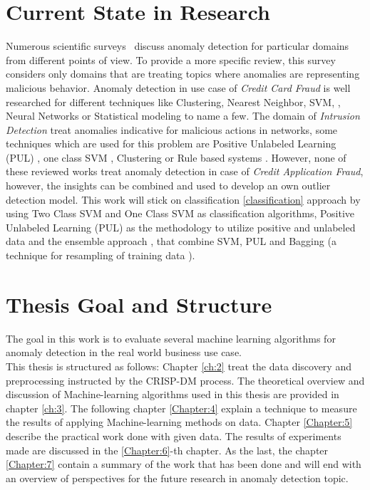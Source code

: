 \section{Current State in Research}\label{state-of-the-art}
Numerous scientific surveys~\cite{Agyemang:2006:CSN:1609942.1609946,Chandola:2009:ADS:1541880.1541882,Chandola:2012:ADD:2197072.2197116,Pimentel:2014:RRN:2588908.2589196} discuss anomaly detection for particular domains from different points of view. To provide a more specific review, this survey considers only domains that are treating topics where anomalies are representing malicious behavior. Anomaly detection in use case of \textit{Credit Card Fraud} is well researched for different techniques like Clustering, Nearest Neighbor, SVM, \cite{Eskin:2010}, Neural Networks \cite{Ghosh;Reilly;1994} or Statistical modeling \cite{Agarwal:2005} to name a few. The domain of \textit{Intrusion Detection} treat anomalies indicative for malicious actions in networks, some techniques which are used for this problem are Positive Unlabeled Learning (PUL) \cite{Eskin:2010}, one class SVM \cite{Amer:2013:EOS:2500853.2500857}, Clustering \cite{Chandola:2006} or Rule based systems \cite{Salvador:2005}. However, none of these reviewed works treat anomaly detection in case of \textit{Credit Application Fraud}, however, the insights can be combined and used to develop an own outlier detection model. 
This work will stick on classification \ref{classification} approach by using Two Class SVM \cite{Cortes;Vapnik:1995} and One Class SVM \cite{Tax:2004:SVD:960091.960109} as classification algorithms, Positive Unlabeled Learning (PUL) \cite{Elkan;Noto:2008} as the methodology to utilize positive and unlabeled data and the ensemble approach \cite{journals/prl/MordeletV14}, that combine SVM, PUL and Bagging (a technique for resampling of training data \cite{breiman:ml96}).



\section{Thesis Goal and Structure}\label{goalandstructure}
The goal in this work is to evaluate several machine learning algorithms for anomaly detection in the real world business use case. \\%
This thesis is structured as follows: Chapter \ref{ch:2} treat the data discovery and preprocessing instructed by the CRISP-DM process. The theoretical overview and discussion of Machine-learning algorithms used in this thesis are provided in chapter \ref{ch:3}. The following chapter \ref{Chapter:4} explain a technique to measure the results of applying Machine-learning methods on data. Chapter \ref{Chapter:5} describe the practical work done with given data. The results of experiments made are discussed in the \ref{Chapter:6}-th chapter. As the last, the chapter \ref{Chapter:7} contain a summary of the work that has been done and will end with an overview of perspectives for the future research in anomaly detection topic. 
